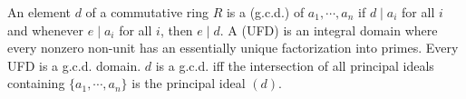 An element $d$ of a commutative ring $R$ is a  (g.c.d.) of $a_1, \cdots, a_n$ if $d \mid a_i$ for all $i$ and whenever $e \mid a_i$ for all $i$, then $e \mid d$. A  (UFD) is an integral domain where every nonzero non-unit has an essentially unique factorization into primes. Every UFD is a g.c.d. domain. $d$ is a g.c.d. iff the intersection of all principal ideals containing $\{a_1,\cdots,a_n\}$ is the principal ideal $(d)$.
